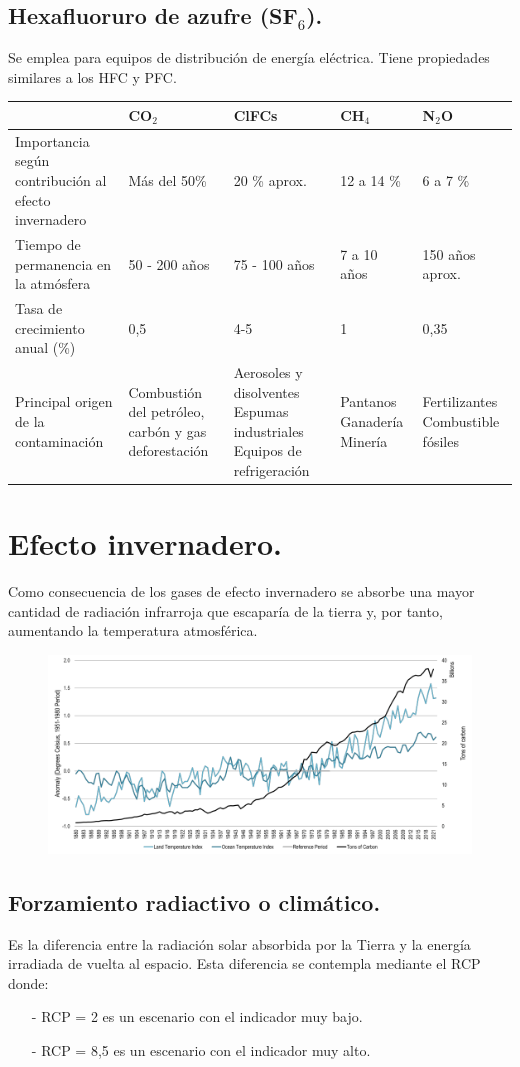 \subsection{Hexafluoruro de azufre (SF$_6$).}
Se emplea para equipos de distribución de energía eléctrica. Tiene propiedades similares a los HFC y PFC.

\begin{table}[H]
	\centering
	\begin{tabular}{p{2cm}p{2cm}p{2cm}p{2cm}p{2cm}}
		\hline
		\textbf{ } & \textbf{CO$_2$} & \textbf{ClFCs} & \textbf{CH$_4$} & \textbf{N$_2$O} \\ \hline
		Importancia según contribución al efecto invernadero & Más del 50\% & 20 \% aprox. & 12 a 14 \% & 6 a 7 \% \\ \hline
		Tiempo de permanencia en la atmósfera & 50 - 200 años & 75 - 100 años & 7 a 10 años & 150 años aprox. \\ \hline
		Tasa de crecimiento anual (\%)&0,5&4-5&1&0,35\\ \hline 
		Principal origen de la contaminación&Combustión del petróleo, carbón y gas deforestación&Aerosoles y disolventes Espumas industriales Equipos de refrigeración&Pantanos Ganadería Minería&Fertilizantes Combustible fósiles\\ \hline 
	\end{tabular}
	\label{tab:my-table}
\end{table}

\section{Efecto invernadero.}
Como consecuencia de los gases de efecto invernadero se absorbe una mayor cantidad de radiación infrarroja que escaparía de la tierra y, por tanto, aumentando la temperatura atmosférica. 
\begin{figure}[H]
	\centering
	\includegraphics[width=0.7\linewidth]{res/tema2/T-Emisiones}
	\label{fig:t-emisiones}
\end{figure}
\subsection{Forzamiento radiactivo o climático.}
Es la diferencia entre la radiación solar absorbida por la Tierra y la energía irradiada de vuelta al espacio. Esta diferencia se contempla mediante el RCP donde:
\begin{itemize}
	\item [-] RCP = 2 es un escenario con el indicador muy bajo.
	\item [-] RCP = 8,5 es un escenario con el indicador muy alto.
\end{itemize}

